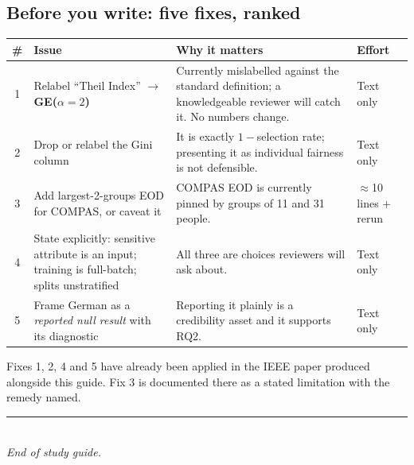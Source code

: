 \subsection{Before you write: five fixes, ranked}

\begin{center}
\small
\renewcommand{\arraystretch}{1.2}
\begin{tabular}{@{}c p{} p{} p{}@{}}
\toprule
\textbf{\#} & \textbf{Issue} & \textbf{Why it matters} & \textbf{Effort} \\
\midrule
1 & Relabel ``Theil Index'' $\to$ \textbf{GE($\alpha{=}2$)} &
Currently mislabelled against the standard definition; a knowledgeable reviewer
will catch it. No numbers change. & Text only \\
2 & Drop or relabel the Gini column &
It is exactly $1-$selection rate; presenting it as individual fairness is not
defensible. & Text only \\
3 & Add largest-2-groups EOD for COMPAS, or caveat it &
COMPAS EOD is currently pinned by groups of 11 and 31 people. & $\approx$10
lines $+$ rerun \\
4 & State explicitly: sensitive attribute is an input; training is full-batch;
splits unstratified &
All three are choices reviewers will ask about. & Text only \\
5 & Frame German as a \emph{reported null result} with its diagnostic &
Reporting it plainly is a credibility asset and it supports RQ2. & Text only \\
\bottomrule
\end{tabular}
\end{center}

\begin{keybox}[Status]
Fixes 1, 2, 4 and 5 have already been applied in the IEEE paper produced
alongside this guide. Fix 3 is documented there as a stated limitation with the
remedy named.
\end{keybox}

\vspace{1.2cm}
\begin{center}
\rule{0.5\textwidth}{0.4pt}\\[6pt]
\small\textit{End of study guide.}
\end{center}
